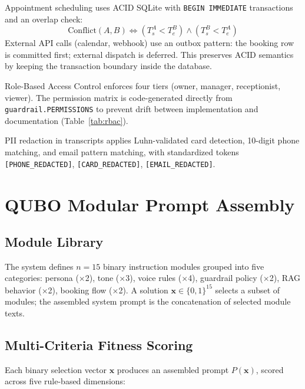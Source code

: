 \documentclass[journal]{IEEEtran}
\begin{document}
Appointment scheduling uses ACID SQLite with \texttt{BEGIN IMMEDIATE}
transactions and an overlap check:
\begin{equation}
\text{Conflict}(A,B) \iff (T_s^A < T_e^B) \land (T_s^B < T_e^A)
\end{equation}
External API calls (calendar, webhook) use an outbox pattern: the booking
row is committed first; external dispatch is deferred. This preserves ACID
semantics by keeping the transaction boundary inside the database.

Role-Based Access Control enforces four tiers (owner, manager,
receptionist, viewer). The permission matrix is code-generated directly from
\texttt{guardrail.PERMISSIONS} to prevent drift between implementation and
documentation (Table~\ref{tab:rbac}).

PII redaction in transcripts applies Luhn-validated card detection, 10-digit
phone matching, and email pattern matching, with standardized tokens
\texttt{[PHONE\_REDACTED]}, \texttt{[CARD\_REDACTED]},
\texttt{[EMAIL\_REDACTED]}.

\section{QUBO Modular Prompt Assembly}\label{sec:qubo}

\subsection{Module Library}

The system defines $n{=}15$ binary instruction modules grouped into five
categories: persona ($\times$2), tone ($\times$3), voice rules ($\times$4),
guardrail policy ($\times$2), RAG behavior ($\times$2), booking flow
($\times$2). A solution $\mathbf{x} \in \{0,1\}^{15}$ selects a subset
of modules; the assembled system prompt is the concatenation of selected
module texts.

\subsection{Multi-Criteria Fitness Scoring}

Each binary selection vector $\mathbf{x}$ produces an assembled prompt
$P(\mathbf{x})$, scored across five rule-based dimensions:
\end{document}
